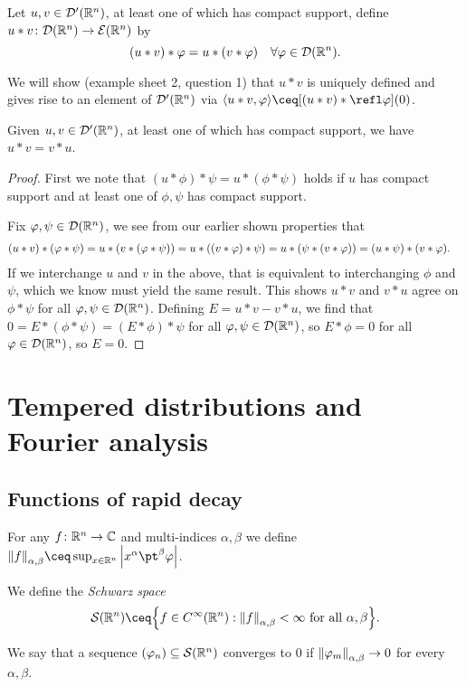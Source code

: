 \begin{definition}
	Let $u, v \in \mathcal D'(\mathbb R^n)$, at least one of which has compact support, define $u * v \colon \mathcal D(\mathbb R^n) \to \mathcal E(\mathbb R^n)$ by
	\[
	(u * v) * \varphi = u * (v * \varphi) \quad \forall \varphi \in \mathcal D(\mathbb R^n). 
	\]
\end{definition}
We will show (example sheet 2, question 1) that $u * v$ is uniquely defined and gives rise to an element of $\mathcal D'(\mathbb R^n)$ via $\ang{u * v, \phi} \ceq [(u * v) * \refl\phi](0)$. 

\begin{lemma}
	Given $u, v \in \mathcal D'(\mathbb R^n)$, at least one of which has compact support, we have $u * v = v * u$. 
\end{lemma}

\begin{proof}
	First we note that $(u * \phi) * \psi = u * (\phi * \psi)$ holds if $u$ has compact support and at least one of $\phi, \psi$ has compact support. 
	
	Fix $\varphi, \psi \in \mathcal D(\mathbb R^n)$, we see from our earlier shown properties that 
	\begin{align*}
	(u * v) * (\varphi * \psi) &= u * \qty(v * (\varphi * \psi)) = u * ((v * \varphi) * \psi) = u * (\psi * (v * \varphi)) = (u * \psi) * (v * \varphi).
	\end{align*}
	If we interchange $u$ and $v$ in the above, that is equivalent to interchanging $\phi$ and $\psi$, which we know must yield the same result. This shows $u * v$ and $v * u$ agree on $\phi * \psi$ for all $\varphi, \psi \in \mathcal D(\mathbb R^n)$. Defining $E = u * v - v * u$, we find that $0 = E * (\phi * \psi) = (E * \phi) * \psi$ for all $\varphi, \psi \in \mathcal D(\mathbb R^n)$, so $E * \phi = 0$ for all $\varphi \in \mathcal D(\mathbb R^n)$, so $E = 0$. 
\end{proof}

\section{Tempered distributions and Fourier analysis}
\subsection{Functions of rapid decay}
\begin{definition}
	For any $f \colon \mathbb R^n \to \mathbb C$ and multi-indices $\alpha, \beta$ we define $\norm{f}_{\alpha, \beta} \ceq \sup_{x \in \RR^n} \abs{x^\alpha \pt^\beta\phi}$. 
	
	We define the \emph{Schwarz space}
	\[
	\Cal S(\RR^n) \ceq \qty{f \in C^\infty(\RR^n) : \norm{f}_{\alpha, \beta} < \infty \text{ for all $\alpha, \beta$}}.
	\]
	
	We say that a sequence $(\varphi_n) \subseteq \mathcal S(\mathbb R^n)$ converges to 0 if $\norm{\varphi_m}_{\alpha, \beta} \to 0$ for every $\alpha, \beta$.  
\end{definition}

